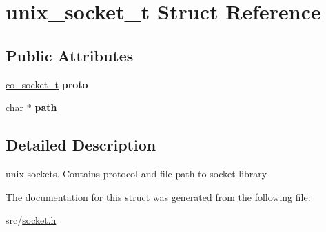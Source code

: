 \hypertarget{structunix__socket__t}{\section{unix\-\_\-socket\-\_\-t Struct Reference}
\label{structunix__socket__t}
}
\subsection*{Public Attributes}
\begin{DoxyCompactItemize}
\item 
\hypertarget{structunix__socket__t_a2d7a292e061c3731747973ae1f97f292}{\hyperlink{structco__socket__t}{co\-\_\-socket\-\_\-t} {\bfseries proto}}\label{structunix__socket__t_a2d7a292e061c3731747973ae1f97f292}

\item 
\hypertarget{structunix__socket__t_a237d9703b3ad03932aea8635e635b043}{char $\ast$ {\bfseries path}}\label{structunix__socket__t_a237d9703b3ad03932aea8635e635b043}

\end{DoxyCompactItemize}


\subsection{Detailed Description}
unix sockets. Contains protocol and file path to socket library 

The documentation for this struct was generated from the following file\-:\begin{DoxyCompactItemize}
\item 
src/\hyperlink{socket_8h}{socket.\-h}\end{DoxyCompactItemize}
